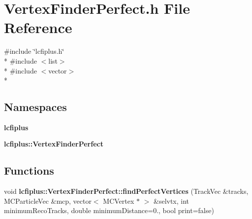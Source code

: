 \section{Vertex\-Finder\-Perfect.\-h File Reference}
\label{VertexFinderPerfect_8h}
{\ttfamily \#include \char`\"{}lcfiplus.\-h\char`\"{}}\\*
{\ttfamily \#include $<$list$>$}\\*
{\ttfamily \#include $<$vector$>$}\\*
\subsection*{Namespaces}
\begin{DoxyCompactItemize}
\item 
{\bf lcfiplus}
\item 
{\bf lcfiplus\-::\-Vertex\-Finder\-Perfect}
\end{DoxyCompactItemize}
\subsection*{Functions}
\begin{DoxyCompactItemize}
\item 
void {\bf lcfiplus\-::\-Vertex\-Finder\-Perfect\-::find\-Perfect\-Vertices} (Track\-Vec \&tracks, M\-C\-Particle\-Vec \&mcp, vector$<$ M\-C\-Vertex $\ast$ $>$ \&selvtx, int minimum\-Reco\-Tracks, double minimum\-Distance=0., bool print=false)
\end{DoxyCompactItemize}
